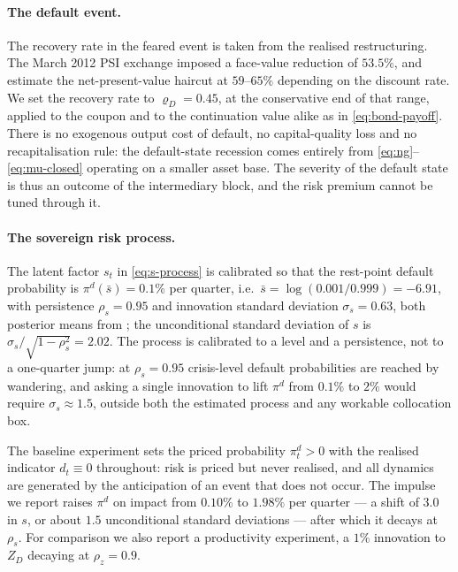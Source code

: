 \paragraph{The default event.}
The recovery rate in the feared event is taken from the realised restructuring.
The March 2012 PSI exchange imposed a face-value reduction of $53.5\%$, and
\citet{zettelmeyer2013} estimate the net-present-value haircut at $59$--$65\%$
depending on the discount rate. We set the recovery rate to $\varrho_D=0.45$, at
the conservative end of that range, applied to the coupon and to the continuation
value alike as in \eqref{eq:bond-payoff}. There is no exogenous output cost of
default, no capital-quality loss and no recapitalisation rule: the default-state
recession comes entirely from \eqref{eq:ng}--\eqref{eq:mu-closed} operating on a
smaller asset base. The severity of the default state is thus an outcome of the
intermediary block, and the risk premium cannot be tuned through it.

\paragraph{The sovereign risk process.}
The latent factor $s_t$ in \eqref{eq:s-process} is calibrated so that the
rest-point default probability is $\pi^{d}(\bar s)=0.1\%$ per quarter, i.e.\
$\bar s=\log(0.001/0.999)=-6.91$, with persistence $\rho_s=0.95$ and innovation
standard deviation $\sigma_s=0.63$, both posterior means from
\citet{bocola2016pass}; the unconditional standard deviation of $s$ is
$\sigma_s/\sqrt{1-\rho_s^{2}}=2.02$. The process is calibrated to a level and a
persistence, not to a one-quarter jump: at $\rho_s=0.95$ crisis-level default
probabilities are reached by wandering, and asking a single innovation to lift
$\pi^{d}$ from $0.1\%$ to $2\%$ would require $\sigma_s\approx1.5$, outside both
the estimated process and any workable collocation box.

The baseline experiment sets the priced probability $\pi^{d}_t>0$ with the
realised indicator $d_t\equiv0$ throughout: risk is priced but never realised,
and all dynamics are generated by the anticipation of an event that does not
occur. The impulse we report raises $\pi^{d}$ on impact from $0.10\%$ to $1.98\%$
per quarter --- a shift of $3.0$ in $s$, or about $1.5$ unconditional standard
deviations --- after which it decays at $\rho_s$. For comparison we also report a
productivity experiment, a $1\%$ innovation to $Z_D$ decaying at $\rho_z=0.9$.

